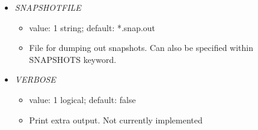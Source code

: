 \documentclass[12pt]{article}
\begin{document}
\begin{itemize}
%
\item {\it SNAPSHOTFILE}
    \begin{itemize}
      \item  value: 1 string; default: *.snap.out
      \item File for dumping out snapshots. Can also be specified within SNAPSHOTS keyword.   
    \end{itemize} 
%
\item {\it VERBOSE}
        \begin{itemize}
          \item  value: 1 logical; default: false 
          \item Print extra output. Not currently implemented
        \end{itemize} 
\end{itemize}

 
\end{document}
